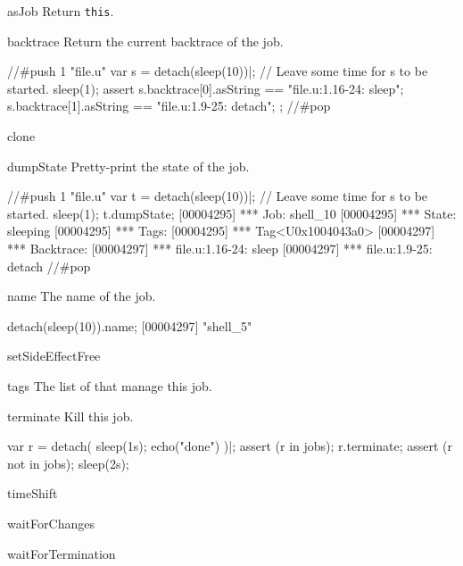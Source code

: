 \begin{urbiscriptapi}
\item[asJob]
  Return \lstinline|this|.

\item[backtrace]
  Return the current backtrace of the job.

\begin{urbiscript}
//#push 1 "file.u"
var s = detach(sleep(10))|;
// Leave some time for s to be started.
sleep(1);
assert
{
  s.backtrace[0].asString == "file.u:1.16-24: sleep";
  s.backtrace[1].asString == "file.u:1.9-25: detach";
};
//#pop
\end{urbiscript}

\item[clone]

\item[dumpState]
  Pretty-print the state of the job.

\begin{urbiscript}
//#push 1 "file.u"
var t = detach(sleep(10))|;
// Leave some time for s to be started.
sleep(1);
t.dumpState;
[00004295] *** Job: shell_10
[00004295] ***   State: sleeping
[00004295] ***   Tags:
[00004295] ***     Tag<U0x1004043a0>
[00004297] ***   Backtrace:
[00004297] ***     file.u:1.16-24: sleep
[00004297] ***     file.u:1.9-25: detach
//#pop
\end{urbiscript}

\item[name]  The name of the job.
\begin{urbiscript}
detach(sleep(10)).name;
[00004297] "shell_5"
\end{urbiscript}

\item[setSideEffectFree]


\item[tags] The list of  that manage this job.

\item[terminate]  Kill this job.
\begin{urbiscript}
var r = detach({ sleep(1s); echo("done") })|;
assert (r in jobs);
r.terminate;
assert (r not in jobs);
sleep(2s);
\end{urbiscript}

\item[timeShift]

\item[waitForChanges]

\item[waitForTermination]

\end{urbiscriptapi}


